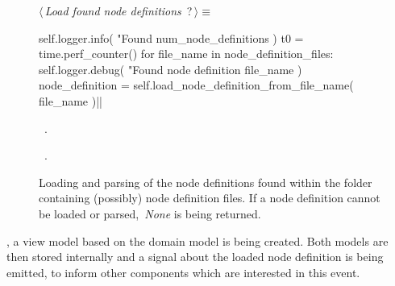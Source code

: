 \documentclass[%
    a4paper,    %
    justified,  %
    nobib,      %
    openany     %
]{tufte-book}
\begin{document}
\begin{figure}[!h]
  \begin{flushleft} \small
\begin{minipage}{\linewidth}\label{scrap7}\raggedright\small
{} $\langle\,${\itshape Load found node definitions}\nobreak\ {\footnotesize {?}}$\,\rangle\equiv$
\vspace{-1ex}
\begin{pythoncode}
self.logger.info(
    "Found %
    num_node_definitions
)
t0 = time.perf_counter()
for file_name in node_definition_files:
    self.logger.debug(
        "Found node definition %
        file_name
    )
    node_definition = self.load_node_definition_from_file_name(
        file_name
    )|\NWsep|
\end{pythoncode}
\vspace{1.5ex}
\footnotesize
\begin{list}{}{\setlength{\itemsep}{-\parsep}\setlength{\itemindent}{-\leftmargin}}
\item \NWtxtMacroDefBy\ .
\item \NWtxtMacroRefIn\ .

\item{}
\end{list}
\end{minipage}\vspace{4ex}
\end{flushleft}
\caption{Loading and parsing of the node definitions found within the folder
    containing (possibly) node definition files. If a node definition cannot be
    loaded or parsed,~\textit{None} is being returned.}
  \label{lst:nodes-controller-load-node-defs}
\end{figure}

\newpage{}

, a view model based on the
domain model is being created. Both models are then stored internally and a
signal about the loaded node definition is being emitted, to inform other
components which are interested in this event.
\end{document}
